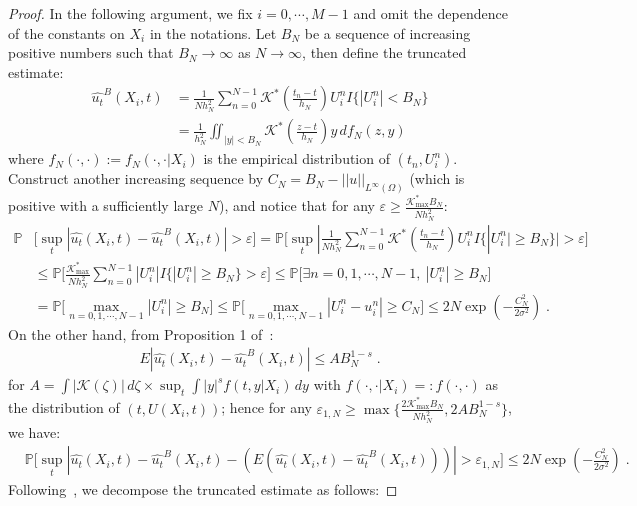 \documentclass[a4paper,11pt]{article}
\theoremstyle{definition}
\begin{document}
\begin{proof}
In the following argument, we fix $i=0,\cdots, M-1$ and omit the dependence of the constants on $X_i$ in the notations. Let $B_N$ be a sequence of increasing positive numbers such that $B_N\to \infty$ as $N\to\infty$, then define the truncated estimate:
\begin{align*}
	\widehat{u_t}^B(X_i,t)&=\frac{1}{Nh^2_N}\sum_{n=0}^{N-1}\mathcal{K}^*(\frac{t_n-t}{h_N})U_i^n I\{|U_i^n|<B_N\}\\
	&=\frac{1}{h^2_N}\iint_{|y|<B_N}\mathcal{K}^*(\frac{z-t}{h_N})y\,df_N(z,y)
\end{align*}
where $f_N(\cdot,\cdot):=f_N(\cdot,\cdot|X_i)$ is the empirical distribution of $(t_n,U_i^n)$. Construct another increasing sequence by $C_N = B_N-||u||_{L^\infty(\Omega)}$ (which is positive with a sufficiently large $N$), and notice that for any $\varepsilon\geq \frac{\mathcal{K}^*_{\max}B_N}{Nh_N^2}$:
\begin{align*}
\mathbb{P}&\Big[\sup_t|\widehat{u_t}(X_i,t)-\widehat{u_t}^B(X_i,t)|>\varepsilon\Big]
=\mathbb{P}\Big[\sup_t |\frac{1}{Nh^2_N}\sum_{n=0}^{N-1}\mathcal{K}^*(\frac{t_n-t}{h_N})U_i^n I\{|U_i^n|\geq B_N\}|>\varepsilon\Big]\\
&\leq \mathbb{P}\Big[\frac{\mathcal{K}^*_{\max}}{Nh_N^2}\sum_{n=0}^{N-1}|U_i^n|I\{|U_i^n|\geq B_N\}>\varepsilon\Big]
\leq \mathbb{P}\Big[\exists n=0,1,\cdots, N-1,~|U_i^n|\geq B_N\Big]\\
& = \mathbb{P}\Big[\max_{n=0,1,\cdots,N-1}|U_i^n|\geq B_N\Big]
\leq \mathbb{P}\Big[\max_{n=0,1,\cdots, N-1}|U_i^n-u_i^n|\geq C_N\Big]\leq 2N \exp(-\frac{C_N^2}{2\sigma^2})\;.
\end{align*}
On the other hand, from Proposition 1 of~\cite{mack1982weak}:
\begin{align*}
E|\widehat{u_t}(X_i,t)-\widehat{u_t}^B(X_i,t)|\leq AB_N^{1-s}\;.
\end{align*}
for $A=\int|\mathcal{K}(\zeta)|\,d\zeta\times\sup_{t}\int|y|^sf(t,y|X_i)\,dy$ with $f(\cdot,\cdot|X_i)=:f(\cdot,\cdot)$ as the distribution of $(t,U(X_i,t))$; hence for any $\varepsilon_{1,N}\geq \max\{\frac{2\mathcal{K}^*_{\max}B_N}{Nh_N^2},2AB_N^{1-s}\}$, we have:
\begin{align}
&\mathbb{P}\Big[\sup_t|\widehat{u_t}(X_i,t)-\widehat{u_t}^B(X_i,t)-(E(\widehat{u_t}(X_i,t)-\widehat{u_t}^B(X_i,t)))|>\varepsilon_{1,N}\Big]\leq 2N \exp(-\frac{C_N^2}{2\sigma^2})\;.\label{eq.sup}
\end{align}
Following~\cite{mack1982weak}, we decompose the truncated estimate as follows:

\end{proof}
\end{document}
